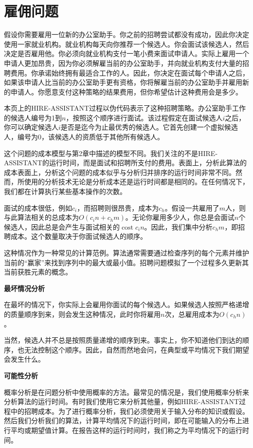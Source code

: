 \documentclass[lang=cn,newtx,10pt,scheme=chinese]{elegantbook}
\begin{document}
\section{雇佣问题}

假设你需要雇用一位新的办公室助手。你之前的招聘尝试都没有成功，因此你决定使用一家就业机构。就业机构每天向你推荐一个候选人。你会面试该候选人，然后决定是否雇用他。你必须向就业机构支付一笔小费来面试申请人。实际上雇用一个申请人更加昂贵，因为你必须解雇当前的办公室助手，并向就业机构支付大量的招聘费用。你承诺始终拥有最适合工作的人。因此，你决定在面试每个申请人之后，如果该申请人比当前的办公室助手更有资格，你将解雇当前的办公室助手并雇用新的申请人。你愿意支付这种策略的结果费用，但你希望估计这种费用会是多少。

本页上的HIRE-ASSISTANT过程以伪代码表示了这种招聘策略。办公室助手工作的候选人编号为1到$n$，按照这个顺序进行面试。该过程假定在面试候选人$i$之后，你可以确定候选人$i$是否是迄今为止最优秀的候选人。它首先创建一个虚拟候选人，编号为0，该候选人的资质低于其他所有候选人。

这个问题的成本模型与第2章中描述的模型不同。我们关注的不是HIRE-ASSISTANT的运行时间，而是面试和招聘所支付的费用。表面上，分析此算法的成本表面上，分析这个问题的成本似乎与分析归并排序的运行时间非常不同。然而，所使用的分析技术无论是分析成本还是运行时间都是相同的。在任何情况下，我们都在计算执行某些基本操作的次数。

面试的成本很低，例如$c_i$，而招聘则很昂贵，成本为$c_h$。假设一共雇用了$m$人，则与此算法相关的总成本为$O\left(c_i n+c_h m\right)$。无论你雇用多少人，你总是会面试$n$个候选人，因此总是会产生与面试相关的$\operatorname{cost} c_i n$。因此，我们集中分析$c_h m$，即招聘成本。这个数量取决于你面试候选人的顺序。

这种情况作为一种常见的计算范例。算法通常需要通过检查序列的每个元素并维护当前的“赢家”来找到序列中的最大或最小值。招聘问题模拟了一个过程多久更新其当前获胜元素的概念。

\textbf{最坏情况分析}

在最坏的情况下，你实际上会雇用你面试的每个候选人。如果候选人按照严格递增的质量顺序到来，则会发生这种情况，此时你将雇用$n$次，总雇用成本为$O\left(c_h n\right)$。

当然，候选人并不总是按照质量递增的顺序到来。事实上，你不知道他们到达的顺序，也无法控制这个顺序。因此，自然而然地会问，在典型或平均情况下我们期望会发生什么。

\textbf{可能性分析}

概率分析是在问题分析中使用概率的方法。最常见的情况是，我们使用概率分析来分析算法的运行时间。有时我们使用它来分析其他量，例如HIRE-ASSISTANT过程中的招聘成本。为了进行概率分析，我们必须使用关于输入分布的知识或假设。然后我们分析我们的算法，计算平均情况下的运行时间，即在可能输入的分布上进行平均或期望值计算。在报告这样的运行时间时，我们称之为平均情况下的运行时间。
\end{document}
